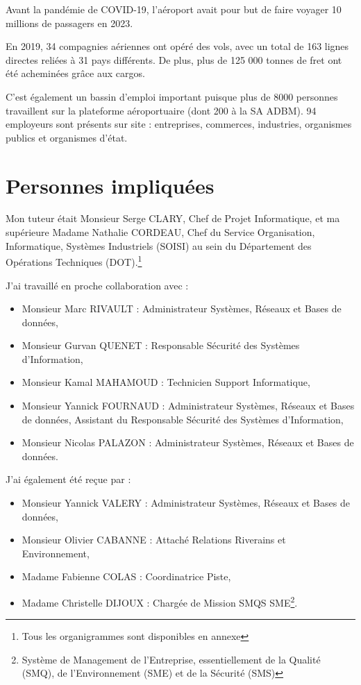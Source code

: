 Avant la pandémie de COVID-19, l'aéroport avait pour but de faire voyager 10 millions de passagers en 2023.

En 2019, 34 compagnies aériennes ont opéré des vols, avec un total de 163 lignes directes reliées à 31 pays différents.
De plus, plus de 125 000 tonnes de fret ont été acheminées grâce aux cargos.

C'est également un bassin d'emploi important puisque plus de 8000 personnes travaillent sur la plateforme aéroportuaire (dont 200 à la SA ADBM).
94 employeurs sont présents sur site : entreprises, commerces, industries, organismes publics et organismes d'état.

\section{Personnes impliquées}


Mon tuteur était Monsieur Serge CLARY, Chef de Projet Informatique, et ma supérieure Madame Nathalie CORDEAU, Chef du Service Organisation, Informatique, Systèmes Industriels (SOISI) au sein du Département des Opérations Techniques (DOT).\footnote{Tous les organigrammes sont disponibles en annexe}

J'ai travaillé en proche collaboration avec :

\begin{itemize}
    \item Monsieur Marc RIVAULT : Administrateur Systèmes, Réseaux et Bases de données,
    \item Monsieur Gurvan QUENET : Responsable Sécurité des Systèmes d'Information,
    \item Monsieur Kamal MAHAMOUD : Technicien Support Informatique,
    \item Monsieur Yannick FOURNAUD : Administrateur Systèmes, Réseaux et Bases de données, Assistant du Responsable Sécurité des Systèmes d'Information,
    \item Monsieur Nicolas PALAZON : Administrateur Systèmes, Réseaux et Bases de données.\newline
\end{itemize}

J'ai également été reçue par :

\begin{itemize}
    \item Monsieur Yannick VALERY : Administrateur Systèmes, Réseaux et Bases de données,
    \item Monsieur Olivier CABANNE : Attaché Relations Riverains et Environnement,
    \item Madame Fabienne COLAS : Coordinatrice Piste,
    \item Madame Christelle DIJOUX : Chargée de Mission SMQS SME\footnote{Système de Management de l'Entreprise, essentiellement de la Qualité (SMQ), de l'Environnement (SME) et de la Sécurité (SMS)}.\newline
\end{itemize}


